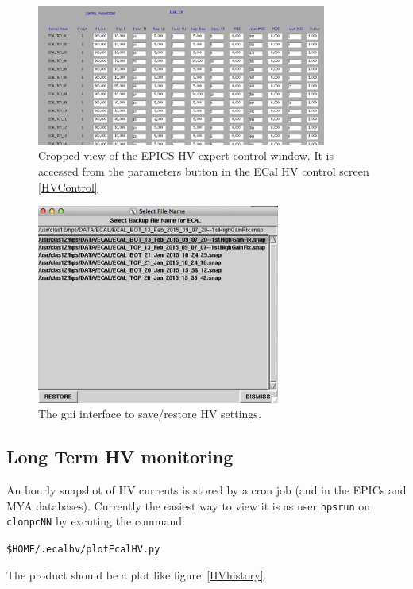 \documentclass[12pt]{article}
\begin{document}
{\begin{figure}[htbp] \centering
\includegraphics[width=0.85\textwidth]{pics/ecalhv_parameters_2014_12_15.png}
\caption{ \label{EHV} Cropped view of the EPICS HV expert control window. It is accessed from the parameters button in the ECal HV control screen \ref{HVControl}}
\end{figure}

\begin{figure}[htbp]\centering
    \includegraphics[width=8cm]{pics/hvrestore.png}
    \caption{The gui interface to save/restore HV settings.  \label{fig:hvrestore}}
\end{figure}

   \subsection{Long Term HV monitoring}

   An hourly snapshot of HV currents is stored by a cron job (and in the EPICs and MYA databases).  Currently the easiest way to view it is as user \texttt{hpsrun} on \texttt{clonpcNN} by excuting the command:
   \begin{center}
   \texttt{\$HOME/.ecalhv/plotEcalHV.py}
   \end{center}
The product should be a plot like figure~\ref{HVhistory}.

}
\end{document}
